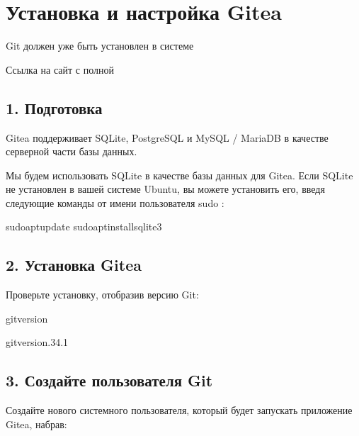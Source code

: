\documentclass[a4paper,10pt,russian]{report}
\begin{document}
\sphinxstepscope


\chapter{Установка и настройка Gitea}
\label{\detokenize{git:gitea}}\label{\detokenize{git::doc}}
\sphinxAtStartPar
Git должен уже быть установлен в системе \sphinxhyphen{}  

\sphinxAtStartPar
Ссылка на сайт с полной 


\section{1. Подготовка}
\label{\detokenize{git:id2}}
\sphinxAtStartPar
Gitea поддерживает SQLite, PostgreSQL и MySQL / MariaDB в качестве серверной части базы данных.

\sphinxAtStartPar
Мы будем использовать SQLite в качестве базы данных для Gitea. Если SQLite не установлен в вашей
системе Ubuntu, вы можете установить его, введя следующие команды от имени пользователя sudo :

\begin{sphinxVerbatim}[commandchars=\\\{\}]
\PYGZdl{}sudoaptupdate
\PYGZdl{}sudoaptinstallsqlite3
\end{sphinxVerbatim}


\section{2. Установка Gitea}
\label{\detokenize{git:id3}}
\sphinxAtStartPar
Проверьте установку, отобразив версию Git:

\begin{sphinxVerbatim}[commandchars=\\\{\}]
\PYGZdl{}git\PYGZhy{}\PYGZhy{}version
\end{sphinxVerbatim}

\begin{sphinxVerbatim}[commandchars=\\\{\}]
\PYGZdl{}gitversion.34.1
\end{sphinxVerbatim}


\section{3. Создайте пользователя Git}
\label{\detokenize{git:git}}
\sphinxAtStartPar
Создайте нового системного пользователя, который будет запускать приложение Gitea, набрав:
\end{document}
